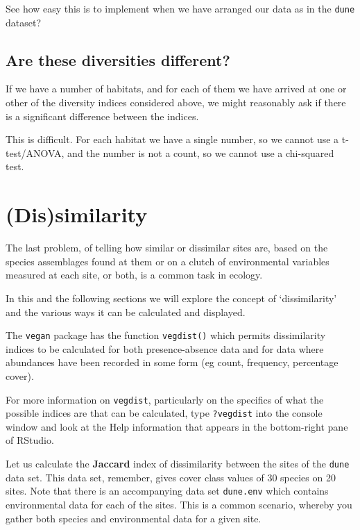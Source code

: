 \documentclass[
  letterpaper,
  DIV=11,
  numbers=noendperiod]{scrreprt}
\begin{document}
See how easy this is to implement when we have arranged our data as in
the \texttt{dune} dataset?

\subsection{Are these diversities
different?}\label{are-these-diversities-different}

If we have a number of habitats, and for each of them we have arrived at
one or other of the diversity indices considered above, we might
reasonably ask if there is a significant difference between the indices.

This is difficult. For each habitat we have a single number, so we
cannot use a t-test/ANOVA, and the number is not a count, so we cannot
use a chi-squared test.

\section{(Dis)similarity}\label{dissimilarity}

The last problem, of telling how similar or dissimilar sites are, based
on the species assemblages found at them or on a clutch of environmental
variables measured at each site, or both, is a common task in ecology.

In this and the following sections we will explore the concept of
`dissimilarity' and the various ways it can be calculated and displayed.

The \texttt{vegan} package has the function \texttt{vegdist()} which
permits dissimilarity indices to be calculated for both presence-absence
data and for data where abundances have been recorded in some form (eg
count, frequency, percentage cover).

For more information on \texttt{vegdist}, particularly on the specifics
of what the possible indices are that can be calculated, type
\texttt{?vegdist} into the console window and look at the Help
information that appears in the bottom-right pane of RStudio.

Let us calculate the \textbf{Jaccard} index of dissimilarity between the
sites of the \texttt{dune} data set. This data set, remember, gives
cover class values of 30 species on 20 sites. Note that there is an
accompanying data set \texttt{dune.env} which contains environmental
data for each of the sites. This is a common scenario, whereby you
gather both species and environmental data for a given site.
\end{document}
